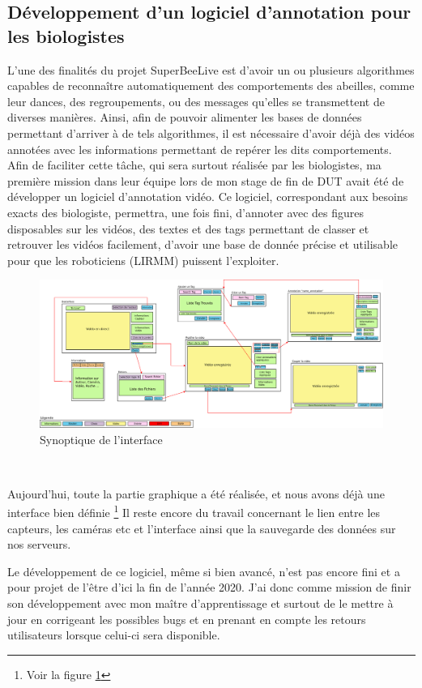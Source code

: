 \documentclass[11pt,french,a4paper]{report}
\begin{document}
\subsection{Développement d'un logiciel d'annotation pour les biologistes}
L'une des finalités du projet SuperBeeLive est d'avoir un ou plusieurs algorithmes capables de reconnaître automatiquement 
des comportements des abeilles, comme leur dances, des regroupements, ou des messages qu'elles se transmettent de diverses manières.
Ainsi, afin de pouvoir alimenter les bases de données permettant d'arriver à de tels algorithmes, il est nécessaire d'avoir 
déjà des vidéos annotées avec les informations permettant de repérer les dits comportements. 
Afin de faciliter cette tâche, qui sera surtout réalisée par les biologistes, ma première mission dans leur équipe lors de mon 
stage de fin de DUT avait été de développer un logiciel d'annotation vidéo. Ce logiciel, correspondant aux besoins exacts des 
biologiste, permettra, une fois fini, d'annoter avec des figures disposables sur les vidéos, des textes et des tags permettant de
classer et retrouver les vidéos facilement, d'avoir une base de donnée précise et utilisable pour que les roboticiens (LIRMM) puissent
l'exploiter. 

\begin{figure}[h!]
    \centering
    \includegraphics[width=17cm]{./img/schema_interface.png}
    \caption{Synoptique de l'interface}
    \label{syn}
\end{figure} 

Aujourd'hui, toute la partie graphique a été réalisée, et nous avons déjà une interface bien 
définie \footnote{Voir la figure \ref{syn}}
Il reste encore du travail concernant le lien entre les capteurs, les caméras etc et l'interface ainsi que la sauvegarde
des données sur nos serveurs. 

Le développement de ce logiciel, même si bien avancé, n'est pas encore fini et a pour projet de l'être d'ici la fin de l'année 2020. 
J'ai donc comme mission de finir son développement avec mon maître d'apprentissage et surtout de le mettre à jour en corrigeant les 
possibles bugs et en prenant en compte les retours utilisateurs lorsque celui-ci sera disponible. 
\end{document}
